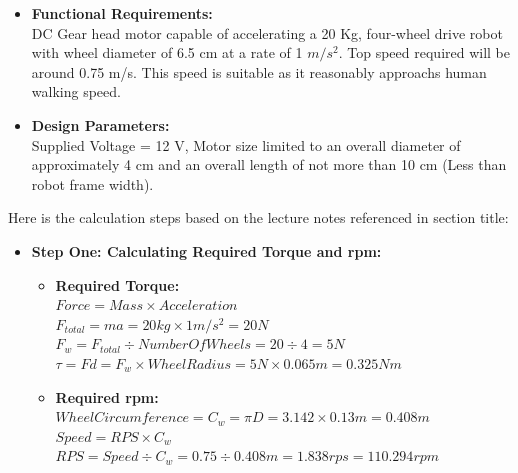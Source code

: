 \documentclass[12pt]{article}
\begin{document}
\begin{itemize}
	\item \textbf{Functional Requirements:}
	\\ DC Gear head motor capable of accelerating a 20 Kg, four-wheel drive robot with wheel diameter of 6.5 cm at a rate of 1 ${m/s^2}$. Top speed required will be around 0.75 m/s. This speed is suitable as it reasonably approachs human walking speed.
	\item \textbf{Design Parameters:}
	\\Supplied Voltage = 12 V, Motor size limited to an overall diameter of approximately 4 cm and an overall length of not more than 10 cm (Less than robot frame width).
\end{itemize}
Here is the calculation steps based on the lecture notes referenced in section title:
\begin{itemize}
	\item \textbf{Step One: Calculating Required Torque and rpm:}
	\begin{itemize}
		\item \textbf{Required Torque:} \\
		${Force = Mass \times Acceleration}$\\
		${F_{total} = ma = 20 kg \times 1 m/s^2 = 20 N}$\\
		${F_w = F_{total} \div NumberOfWheels = 20 \div 4 = 5N }$\\
		${\tau = F d = F_w \times WheelRadius = 5 N \times 0.065 m = 0.325 Nm}$\\
		
		\newpage
		
		\item \textbf{Required rpm:}\\
		${Wheel Circumference = C_w = \pi D = 3.142 \times 0.13 m = 0.408m}$\\
		${Speed = RPS \times C_w}$\\
		${RPS = Speed \div C_w = 0.75 \div 0.408m = 1.838 rps = 110.294 rpm}$\\
		
	\end{itemize}
	

\end{itemize}
\end{document}
